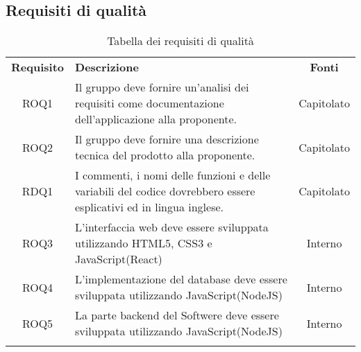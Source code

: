 \subsection{Requisiti di qualità}
\begin{longtable}{| c | p{10cm} | c |}
		\rowcolor{LightBlue}
		\color{white}\bfseries Requisito & \color{white}\bfseries Descrizione & \color{white}\bfseries Fonti\\[0.25cm]
		ROQ1 & Il gruppo deve fornire un'analisi dei requisiti come documentazione dell'applicazione alla proponente. & Capitolato \\
		ROQ2 & Il gruppo deve fornire una descrizione tecnica del prodotto alla proponente. & Capitolato \\ 
		RDQ1 & I commenti, i nomi delle funzioni e delle variabili del codice dovrebbero essere esplicativi ed in lingua inglese. & Capitolato \\ 
		ROQ3 & L’interfaccia web deve essere sviluppata utilizzando HTML5, CSS3 e JavaScript(React) & Interno\\
		ROQ4 & L'implementazione del database deve essere sviluppata utilizzando JavaScript(NodeJS) & Interno\\
		ROQ5 & La parte backend del Softwere deve essere sviluppata utilizzando JavaScript(NodeJS) & Interno\\
		\hline
		\caption{Tabella dei requisiti di qualità}
\end{longtable}
\newpage